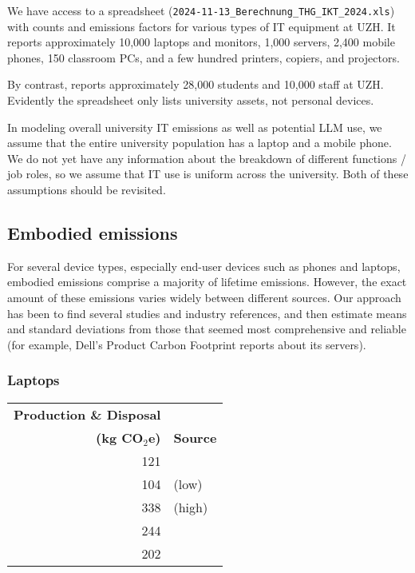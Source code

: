 \documentclass[11pt]{article}
\newcommand{\assumption}[1]{{#1}}
\begin{document}
We have access to a spreadsheet (\texttt{2024-11-13\_Berechnung\_THG\_IKT\_2024.xls}) with
counts and emissions factors for various types of IT equipment at UZH. It reports approximately
10,000 laptops and monitors, 1,000 servers, 2,400 mobile phones,  150 classroom PCs, and a few
hundred printers, copiers, and projectors.

By contrast, \textcite{wikiuzh} reports approximately 28,000 students and 10,000 staff
at UZH. Evidently the spreadsheet only lists university assets, not personal devices.

\assumption{In modeling overall university IT emissions as well as potential LLM use,
we assume that the entire university population has a laptop and a mobile phone.}
We do not yet have any information about the breakdown of different functions / job roles, so
\assumption{we assume that IT use is uniform across the university}. Both of these assumptions
should be revisited.

\subsection{Embodied emissions}

For several device types, especially end-user devices such as phones and laptops, embodied emissions
comprise a majority of lifetime emissions. However, the exact amount of these emissions varies
widely between different sources. Our approach has been to find several studies and industry references,
and then estimate means and standard deviations from those that seemed most comprehensive and reliable
(for example, Dell's Product Carbon Footprint reports about its servers).

\subsubsection{Laptops}

\begin{center}
\begin{tabular}{|r|l|}
\hline
\textbf{Production \& Disposal} & \\
\textbf{(kg CO$_2$e)} & \textbf{Source} \\ \hline
121 & \textcite{ecoinvent}  \\ \hline
104 & \textcite{teehan2013} (low) \\ \hline
338 & \textcite{teehan2013} (high) \\ \hline
244 & \textcite{rarecoil} \\ \hline
202 & \textcite{unctadder2024} \\ \hline
\end{tabular}
\label{tab:embodied_emissions:laptops}
\end{center}
\end{document}
